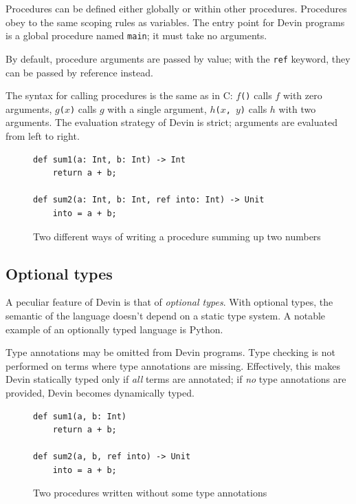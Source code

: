 \documentclass[11pt, american, draft]{PhdThesis}
\begin{document}
  Procedures can be defined either globally or within other procedures. Procedures obey to the same
  scoping rules as variables. The entry point for Devin programs is a global procedure named
  \verb$main$; it must take no arguments.

  By default, procedure arguments are passed by value; with the \texttt{ref} keyword, they can be
  passed by reference instead.

  The syntax for calling procedures is the same as in C: \mbox{\texttt{$f$()}} calls $f$ with zero
  arguments, \mbox{\texttt{$g$($x$)}} calls $g$ with a single argument,
  \mbox{\texttt{$h$($x$, $y$)}} calls $h$ with two arguments. The evaluation strategy of Devin is
  strict; arguments are evaluated from left to right.

  \begin{figure}[H]
    \center

\begin{verbatim}
def sum1(a: Int, b: Int) -> Int
    return a + b;

def sum2(a: Int, b: Int, ref into: Int) -> Unit
    into = a + b;
\end{verbatim}

    \caption{Two different ways of writing a procedure summing up two numbers}
  \end{figure}

  \subsection{Optional types}

  A peculiar feature of Devin is that of \emph{optional types}. With optional types, the semantic of
  the language doesn't depend on a static type system\cite{bracha}. A notable example of an
  optionally typed language is Python.

  Type annotations may be omitted from Devin programs. Type checking is not performed on terms where
  type annotations are missing. Effectively, this makes Devin statically typed only if \emph{all}
  terms are annotated; if \emph{no} type annotations are provided, Devin becomes dynamically typed.

  \begin{figure}[H]
    \center

\begin{verbatim}
def sum1(a, b: Int)
    return a + b;

def sum2(a, b, ref into) -> Unit
    into = a + b;
\end{verbatim}

    \caption{Two procedures written without some type annotations}
  \end{figure}
\end{document}
